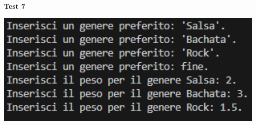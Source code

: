 \documentclass[a4paper,11pt]{article}
\begin{document}
    \begin{center}
        \textbf{Test 7}
        \par
        \vspace{0.5cm}
        \includegraphics[width=1\textwidth]{Immagini/Tests/ptest7}
    \end{center}
\end{document}
